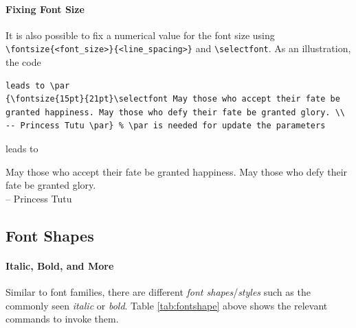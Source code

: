 \paragraph{Fixing Font Size}
It is also possible to fix a numerical value for the font size using \texttt{\textbackslash fontsize\{<font\_size>\}\{<line\_spacing>\}} and \texttt{\textbackslash selectfont}. As an illustration, the code
\begin{lstlisting}
leads to \par
{\fontsize{15pt}{21pt}\selectfont May those who accept their fate be granted happiness. May those who defy their fate be granted glory. \\ -- Princess Tutu \par} % \par is needed for update the parameters
\end{lstlisting}
leads to \par
\begin{samepage}
\fontsize{15pt}{21pt}\selectfont May those who accept their fate be granted happiness. May those who defy their fate be granted glory. \\
-- Princess Tutu \par
\end{samepage}

\subsection{Font Shapes}

\paragraph{Italic, Bold, and More}
Similar to font families, there are different \textit{font shapes}/\allowbreak\textit{styles} such as the commonly seen \textit{italic} or \textit{bold}. Table \ref{tab:fontshape} above shows the relevant commands to invoke them.

